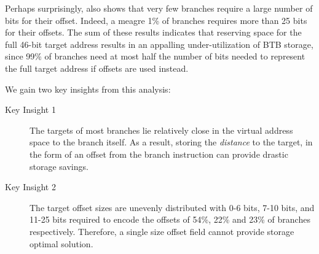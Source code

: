 Perhaps surprisingly,  also shows that very few branches require a large number of bits for their offset. Indeed, a meagre 1\% of branches requires more than 25 bits for their offsets. The sum of these results indicates that reserving space for the full 46-bit target address results in an appalling under-utilization of BTB storage, since 99\% of branches need at most half the number of bits needed to represent the full target address if offsets are used instead.

We gain two key insights from this analysis:

\begin{description}
\item[Key Insight 1] The targets of most branches lie relatively close in the virtual address space to the branch itself. As a result, storing the {\em distance} to the target, in the form of an offset from the branch instruction can provide drastic storage savings.

\item[Key Insight 2] The target offset sizes are unevenly distributed with 0-6 bits, 7-10 bits, and 11-25 bits required to encode the offsets of 54\%, 22\% and 23\% of branches respectively. Therefore, a single size offset field cannot provide storage optimal solution.
\end{description}

